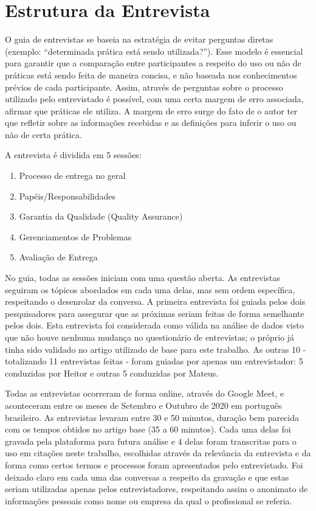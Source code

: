\section{Estrutura da Entrevista}

O guia de entrevistas se baseia na estratégia de evitar perguntas diretas (exemplo: “determinada prática está sendo utilizada?”). Esse modelo é essencial para garantir que a comparação entre participantes a respeito do uso ou não de práticas está sendo feita de maneira concisa, e não baseada nos conhecimentos prévios de cada participante. Assim, através de perguntas sobre o processo utilizado pelo entrevistado é possível, com uma certa margem de erro associada, afirmar que práticas ele utiliza. A margem de erro surge do fato de o autor ter que refletir sobre as informações recebidas e as definições para inferir o uso ou não de certa prática.

A entrevista é dividida em 5 sessões: 

\begin{enumerate}
\item Processo de entrega no geral
\item Papéis/Responsabilidades
\item Garantia da Qualidade (Quality Assurance)
\item Gerenciamentos de Problemas
\item Avaliação de Entrega
\end{enumerate}

No guia, todas as sessões iniciam com uma questão aberta. As entrevistas seguiram os tópicos abordados em cada uma delas, mas sem ordem específica, respeitando o desenrolar da conversa. A primeira entrevista foi guiada pelos dois pesquisadores para assegurar que as próximas seriam feitas de forma semelhante pelos dois. Esta entrevista foi considerada como válida na análise de dados visto que não houve nenhuma mudança no questionário de entrevistas; o próprio já tinha sido validado no artigo utilizado de base para este trabalho. As outras 10 - totalizando 11 entrevistas feitas - foram guiadas por apenas um entrevistador: 5 conduzidas por Heitor e outras 5 conduzidas por Mateus.


Todas as entrevistas ocorreram de forma online, através do Google Meet, e aconteceram entre os meses de Setembro e Outubro de 2020 em português brasileiro. As entrevistas levaram entre 30 e 50 minutos, duração bem parecida com os tempos obtidos no artigo base (35 a 60 minutos). Cada uma delas foi gravada pela plataforma para futura análise e 4 delas foram transcritas para o uso em citações neste trabalho, escolhidas através da relevância da entrevista e da forma como certos termos e processos foram apresentados pelo entrevistado. Foi deixado claro em cada uma das conversas a respeito da gravação e que estas seriam utilizadas apenas pelos entrevistadores, respeitando assim o anonimato de informações pessoais como nome ou empresa da qual o profissional se referia.

